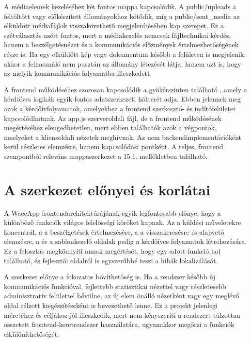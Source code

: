 A médiaelemek kezeléséhez két fontos mappa kapcsolódik. A public/uploads a feltöltött vagy előkészített állományokhoz kötődik, míg a public/sent\_media az elküldött médiafájlok visszakövethető megjelenítésében kap szerepet. Ez a szétválasztás azért fontos, mert a médiakezelés nemcsak fájltechnikai kérdés, hanem a beszélgetésnézet és a kommunikációs előzmények értelmezhetőségének része is. Ha egy elküldött kép vagy dokumentum később a  felületen is megjelenik, akkor a felhasználó nem pusztán az állomány létezését látja, hanem azt is, hogy az melyik kommunikációs folyamatba illeszkedett. 

A frontend működéséhez szorosan kapcsolódik a gyökérszinten található , amely a kérdőíves logikák egyik fontos adatszerkezeti hátterét adja. Ebben jelennek meg azok a kérdőívfolyamatok, amelyekhez a frontend szerkesztő- és indítófelületei kapcsolódhatnak. Az app.js szerveroldali fájl, de a frontend működésének megértéséhez elengedhetetlen, mert ebben találhatók azok a végpontok, amelyeket a kliensoldali nézetek meghívnak. Az  nem backendimplementációként kerül részletes elemzésre, hanem kapcsolódási pontként. A teljes, frontend szempontból releváns mappaszerkezet a 15.1. mellékletben található.

\section{A szerkezet előnyei és korlátai}

A WaccApp frontendarchitektúrájának egyik legfontosabb előnye, hogy a különböző funkciók világos felelősségi köröket kapnak. Az  a küldési műveletekre koncentrál, a  a beszélgetések értelmezésére, a  a visszakeresésre és alapvető elemzésre, a  és a sablonkezelő oldalak pedig a kérdőíves folyamatok létrehozására. Ez a felosztás megkönnyíti annak megértését, hogy egy adott funkció hol található, és fejlesztői oldalról is egyszerűbbé teszi a hibák lokalizálását. 

A szerkezet előnye a fokozatos bővíthetőség is. Ha a rendszer később új kommunikációs funkcióval, fejlettebb statisztikai nézettel vagy részletesebb adminisztratív felülettel bővülne, az új elem önálló nézetként vagy egy meglévő oldal célzott kiegészítéseként is bevezethető lenne. Ez a projekt jelenlegi méretéhez és céljához jól illeszkedik, mert nem kényszeríti a rendszert túlzottan összetett frontend-keretrendszer használatára, ugyanakkor megőrzi a funkciók elkülöníthetőségét. 

